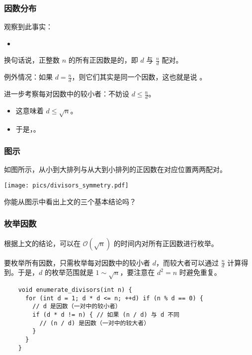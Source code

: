 \begin{frame}
  \frametitle{因数分布}
  观察到此事实：
  \begin{itemize}
    \item {}
  \end{itemize}
  \pause
  换句话说，\alert{正}整数 $n$ 的所有\alert{正}因数是的，即 $d$ 与 $\frac{n}{d}$ 配对。
  \pause
  
  \alert{例外}情况：如果 $d = \frac{n}{d}$，则它们其实是同一个因数，这也就是说 。
  \pause
  \begin{center}
  \end{center}
  \pause
  进一步考察每对因数中的较小者：不妨设 $d \le \frac{n}{d}$。
  \pause
  \begin{itemize}
    \item 这意味着 $d \le \sqrt{n}$。
    \pause
    \item 于是，。
  \end{itemize}
  \pause
  \begin{center}
  \end{center}
\end{frame}
\begin{frame}[c]
  \frametitle{图示}
  如图所示，从小到大排列与从大到小排列的正因数在对应位置两两配对。
  \begin{center}
    \texttt{[image: pics/divisors\_symmetry.pdf]}
  \end{center}
  \pause
  你能从图示中看出上文的三个基本结论吗？
\end{frame}
\begin{frame}[fragile]
  \frametitle{枚举因数}
  根据上文的结论，可以在 $\mathcal O (\sqrt{n})$ 的时间内对所有正因数进行枚举。
  \pause
  
  \emptyline
  要枚举所有因数，只需枚举每对因数中的较小者 $d$，而较大者可以通过 $\frac{n}{d}$ 计算得到。于是，$d$ 的枚举范围就是 $1 \sim \sqrt{n}$，要注意在 $d^2 = n$ 时避免重复。
  \pause
  
  \begin{verbatim}
    void enumerate_divisors(int n) {
      for (int d = 1; d * d <= n; ++d) if (n % d == 0) {
        // d 是因数（一对中的较小者）
        if (d * d != n) { // 如果 (n / d) 与 d 不同
          // (n / d) 是因数（一对中的较大者）
        }
      }
    }
  \end{verbatim}
\end{frame}
